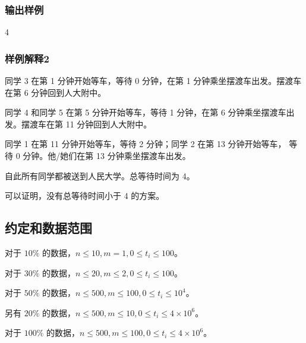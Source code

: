 \documentclass[UTF8]{ctexart}
\begin{document}
\subsubsection{输出样例}

4

\subsubsection{样例解释2}

同学 3 在第 1 分钟开始等车，等待 0 分钟，在第 1 分钟乘坐摆渡车出发。摆渡车在第 6 分钟回到人大附中。

同学 4 和同学 5 在第 5 分钟开始等车，等待 1 分钟，在第 6 分钟乘坐摆渡车出发。摆渡车在第 11 分钟回到人大附中。

同学 1 在第 11 分钟开始等车，等待 2 分钟；同学 2 在第 13 分钟开始等车， 等待 0 分钟。他/她们在第 13 分钟乘坐摆渡车出发。

自此所有同学都被送到人民大学。总等待时间为 4。

可以证明，没有总等待时间小于 4 的方案。

\subsection{约定和数据范围}

对于 $10\%$ 的数据，$n\le 10,m=1,0\le t_i\le 100$。

对于 $30\%$ 的数据，$n\le 20,m\le 2,0\le t_i\le 100$。

对于 $50\%$ 的数据，$n\le 500,m\le 100,0\le t_i\le 10^4$。

另有 $20\%$ 的数据，$n\le 500,m\le 10,0\le t_i\le 4\times 10^6$。

对于 $100\%$ 的数据，$n\le 500,m\le 100,0\le t_i\le 4\times 10^6$。 
\end{document}

